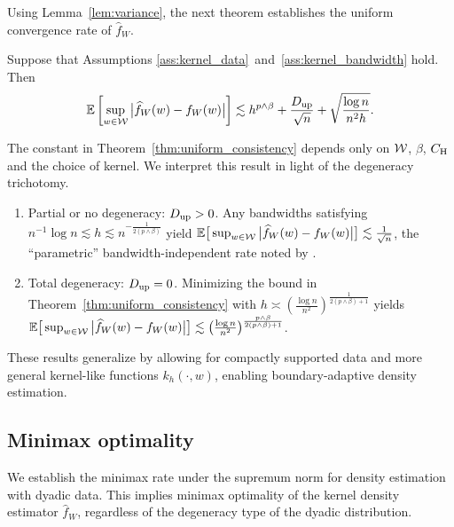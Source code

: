 Using Lemma~\ref{lem:variance},
the next theorem establishes the uniform
convergence rate of $\widehat{f}_W$.
%
\begin{theorem}%
  \label{thm:uniform_consistency}%
  Suppose that Assumptions
  \ref{ass:kernel_data}~and~\ref{ass:kernel_bandwidth}
  hold. Then
  \begin{align*}
    \mathbb{E}\left[
      \sup_{w \in \mathcal{W}}
      \big|\widehat{f}_W(w) - f_W(w)\big|
    \right]
    \lesssim
    h^{p\wedge\beta}
    + \frac{D_{\textup{up}}}{\sqrt n}
    + \sqrt{\frac{\log n}{n^2h}}.
  \end{align*}
\end{theorem}
%
The constant in Theorem~\ref{thm:uniform_consistency}
depends only on $\mathcal{W}$, $\beta$, $C_\mathrm{H}$
and the choice of kernel.
We interpret this result in light of the degeneracy trichotomy.
\begin{enumerate}[label=(\roman*)]\onehalfspacing
  \item Partial or no degeneracy:
    $D_{\textup{up}} > 0$.
    Any bandwidths satisfying
    $n^{-1} \log n \lesssim h \lesssim n^{-\frac{1}{2(p\wedge\beta)}}$
    yield
    $\mathbb{E}\big[\sup_{w \in \mathcal{W}}\big|\widehat f_W(w)
      - f_W(w)\big| \big] \lesssim \frac{1}{\sqrt n}$,
    the ``parametric'' bandwidth-independent rate noted by
    \citet{graham2022kernel}.

  \item Total degeneracy:
    $D_{\textup{up}} = 0$.
    Minimizing the bound in
    Theorem~\ref{thm:uniform_consistency} with
    $h \asymp \left( \frac{\log n}{n^2} \right)^{\frac{1}{2(p\wedge\beta)+1}}$
    yields
    $\mathbb{E}\big[ \sup_{w \in \mathcal{W}} \big|\widehat f_W(w) - f_W(w)\big| \big]
    \lesssim
    \big(\frac{\log n}{n^2} \big)^{\frac{p\wedge\beta}{2(p\wedge\beta)+1}}$.
\end{enumerate}

These results generalize \citet*[Theorem~1]{chiang2020empirical}
by allowing for compactly supported data and more general kernel-like
functions $k_h(\cdot,w)$, enabling boundary-adaptive density estimation.

\subsection{Minimax optimality}

We establish the minimax rate under the
supremum norm for density estimation
with dyadic data.
This implies minimax optimality of the kernel density estimator $\widehat
f_W$, regardless of the degeneracy type of the dyadic distribution.

